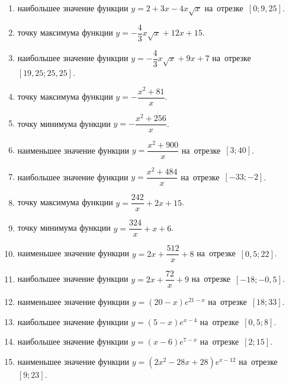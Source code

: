 \documentclass[a4paper,10pt]{article}
\begin{document}
\begin{enumerate}
\item {} наибольшее значение функции $y=2+3x -4x\sqrt{x}$ на~отрезке~$\left[0;9,25\right]$.

\item {} точку максимума функции $y=-\dfrac{4}{3}x\sqrt{x} +12x+15$.

\item {} наибольшее значение функции $y=-\dfrac{4}{3}x\sqrt{x} +9x+7$ на~отрезке~$\left[19,25;25,25\right]$.

\item {} точку максимума функции $y=-\dfrac{x^2 +81}{x}$.

\item {} точку минимума функции $y=-\dfrac{x^2 +256}{x}$.

\item {} наименьшее значение функции $y=\dfrac{x^2 +900}{x}$ на~отрезке~$\left[3;40\right]$.

\item {} наибольшее значение функции $y=\dfrac{x^2 +484}{x}$ на~отрезке~$\left[-33;-2\right]$.

\item {} точку максимума функции $y=\dfrac{242}{x} +2x+15$.

\item {} точку минимума функции $y=\dfrac{324}{x} +x+6$.

\item {} наименьшее значение функции $y=2x+\dfrac{512}{x} +8$ на~отрезке~$\left[0,5;22\right]$.

\item {} наибольшее значение функции $y=2x+\dfrac{72}{x} +9$ на~отрезке~$\left[-18;-0,5\right]$.

\item {} наименьшее значение функции $y=\left(20-x\right)e^{21-x}$ на~отрезке~$\left[18;33\right]$.

\item {} наибольшее значение функции $y=\left(5-x\right)e^{x-4}$ на~отрезке~$\left[0,5;8\right]$.

\item {} наибольшее значение функции $y=\left(x-6\right)e^{7-x}$ на~отрезке~$\left[2;15\right]$.

\item {} наименьшее значение функции $y=\left(2x^2 -28x +28\right)e^{x -12}$ на~отрезке~$\left[9;23\right]$.


\end{enumerate}
\end{document}
